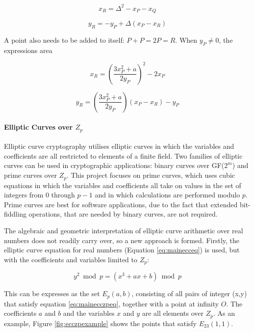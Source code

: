 \documentclass[a4paper,12pt]{report}
\begin{document}
\begin{equation}
  x_{R} = \Delta^{2} - x_{P} - x_{Q} 
  \label{eq:eccbaseadd1}
\end{equation}

\begin{equation}
  y_{R} = -y_{P} + \Delta(x_{P} - x_{R})
  \label{eq:eccbaseadd2}
\end{equation}

A point also needs to be added to itself: $P + P = 2P = R$. When $y_{P} \neq 0$, the expressions area

\begin{equation}
  x_{R} = \left(\frac{3x_{P}^{2} + a}{2y_{P}}\right)^2 - 2x_{P} 
  \label{eq:eccbaseadd3}
\end{equation}

\begin{equation}
  y_{R} = \left(\frac{3x_{P}^{2} + a}{2y_{P}}\right) (x_{P} - x_{R}) - y_{P} 
  \label{eq:eccbaseadd4}
\end{equation}

\paragraph{Elliptic Curves over $Z_{p}$}

Elliptic curve cryptography utilises elliptic curves in which the variables and coefficients are all restricted to elements of a finite field. Two families of elliptic curves can be used in cryptographic applications: binary curves over GF($2^m$) and prime curves over $Z_{p}$. This project focuses on prime curves, which uses cubic equations in which the variables and coefficients all take on values in the set of integers from 0 through $p - 1$ and in which calculations are performed modulo $p$. Prime curves are best for software applications, due to the fact that extended bit-fiddling operations, that are needed by binary curves, are not required. 

The algebraic and geometric interpretation of elliptic curve arithmetic over real numbers does not readily carry over, so a new approach is formed. Firstly, the elliptic curve equation for real numbers (Equation \ref{eq:mainecceq}) is used, but with the coefficients and variables limited to $Z_{p}$:

\begin{equation}
 y^2 \bmod p = (x^3 + ax + b) \bmod p
 \label{eq:mainecczpeq}
\end{equation}

This can be expresses as the set $E_{p}(a,b)$, consisting of all pairs of integer (x,y) that satisfy equation \ref{eq:mainecczpeq}, together with a point at infinity $O$. The coefficients $a$ and $b$ and the variables $x$ and $y$ are all elements over $Z_{p}$. As an example, Figure \ref{fig:ecczpexample} shows the points that satisfy $E_{23}(1,1)$.
\end{document}
